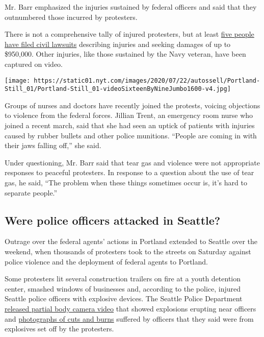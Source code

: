 Mr. Barr emphasized the injuries sustained by federal officers and said
that they outnumbered those incurred by protesters.

There is not a comprehensive tally of injured protesters, but at least
\href{https://www.opb.org/news/article/portland-protesters-lawsuits-police-brutality/}{five
people have filed civil lawsuits} describing injuries and seeking
damages of up to \$950,000. Other injuries, like those sustained by the
Navy veteran, have been captured on video.

\texttt{[image: https://static01.nyt.com/images/2020/07/22/autossell/Portland-Still\_01/Portland-Still\_01-videoSixteenByNineJumbo1600-v4.jpg]}

Groups of nurses and doctors have recently joined the protests, voicing
objections to violence from the federal forces. Jillian Trent, an
emergency room nurse who joined a recent march, said that she had seen
an uptick of patients with injuries caused by rubber bullets and other
police munitions. ``People are coming in with their jaws falling off,''
she said.

Under questioning, Mr. Barr said that tear gas and violence were not
appropriate responses to peaceful protesters. In response to a question
about the use of tear gas, he said, ``The problem when these things
sometimes occur is, it's hard to separate people.''

\hypertarget{were-police-officers-attacked-in-seattle}{%
\subsection{Were police officers attacked in
Seattle?}\label{were-police-officers-attacked-in-seattle}}

Outrage over the federal agents' actions in Portland extended to Seattle
over the weekend, when thousands of protesters took to the streets on
Saturday against police violence and the deployment of federal agents to
Portland.

Some protesters lit several construction trailers on fire at a youth
detention center, smashed windows of businesses and, according to the
police, injured Seattle police officers with explosive devices. The
Seattle Police Department
\href{https://www.youtube.com/watch?v=zF-I2OyGD_A}{released partial body
camera video} that showed explosions erupting near officers and
\href{https://spdblotter.seattle.gov/2020/07/26/officer-injuries-precinct-damage-arrest-updates/}{photographs
of cuts and burns} suffered by officers that they said were from
explosives set off by the protesters.

